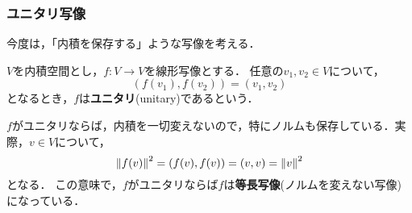\subsubsection{ユニタリ写像}
今度は，「内積を保存する」ような写像を考える．
\begin{dfn}
$V$を内積空間とし，$f \colon V \to V$を線形写像とする．
任意の$v_1,v_2 \in V$について，
\begin{equation}\label{eq:unitary}
  (f(v_1),f(v_2)) = (v_1,v_2)
\end{equation}
となるとき，$f$は\textbf{ユニタリ}(unitary)であるという．
\end{dfn}
$f$がユニタリならば，内積を一切変えないので，特にノルムも保存している．実際，$v \in V$について，
\[
  \left\| f(v) \right\|^2 = (f(v),f(v)) = (v,v) = \left\| v \right\|^2  
\]
となる．
この意味で，$f$がユニタリならば$f$は\textbf{等長写像}(ノルムを変えない写像)になっている．

